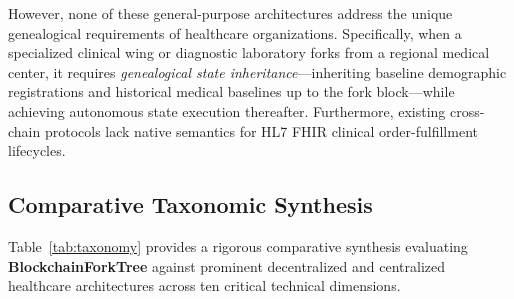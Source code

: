 \documentclass[journal]{IEEEtran}
\theoremstyle{definition}
\begin{document}
However, none of these general-purpose architectures address the unique genealogical requirements of healthcare organizations. Specifically, when a specialized clinical wing or diagnostic laboratory forks from a regional medical center, it requires \textit{genealogical state inheritance}—inheriting baseline demographic registrations and historical medical baselines up to the fork block—while achieving autonomous state execution thereafter. Furthermore, existing cross-chain protocols lack native semantics for HL7 FHIR clinical order-fulfillment lifecycles.

\subsection{Comparative Taxonomic Synthesis}
Table~\ref{tab:taxonomy} provides a rigorous comparative synthesis evaluating \textbf{BlockchainForkTree} against prominent decentralized and centralized healthcare architectures across ten critical technical dimensions.
\end{document}

